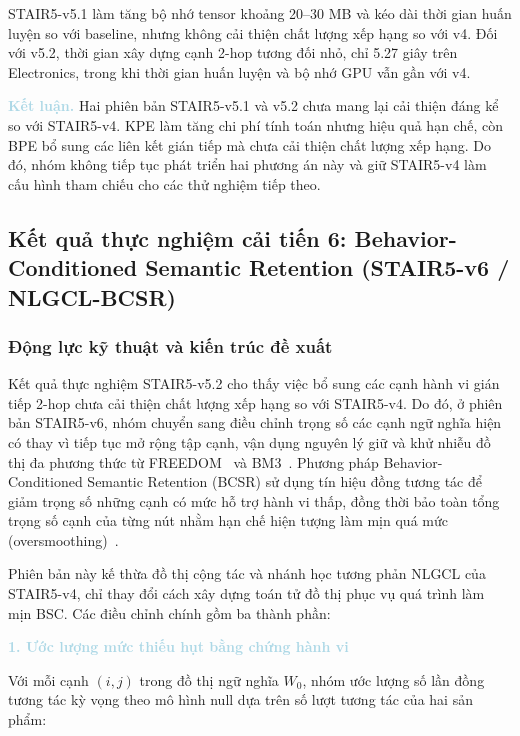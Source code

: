 STAIR5-v5.1 làm tăng bộ nhớ tensor khoảng 20--30 MB và kéo dài thời gian huấn luyện so với baseline, nhưng không cải thiện chất lượng xếp hạng so với v4. Đối với v5.2, thời gian xây dựng cạnh 2-hop tương đối nhỏ, chỉ 5.27 giây trên Electronics, trong khi thời gian huấn luyện và bộ nhớ GPU vẫn gần với v4.

\noindent\textcolor{lightblue}{\textbf{Kết luận.}} Hai phiên bản STAIR5-v5.1 và v5.2 chưa mang lại cải thiện đáng kể so với STAIR5-v4. KPE làm tăng chi phí tính toán nhưng hiệu quả hạn chế, còn BPE bổ sung các liên kết gián tiếp mà chưa cải thiện chất lượng xếp hạng. Do đó, nhóm không tiếp tục phát triển hai phương án này và giữ STAIR5-v4 làm cấu hình tham chiếu cho các thử nghiệm tiếp theo.

\subsection{Kết quả thực nghiệm cải tiến 6: Behavior-Conditioned Semantic Retention (STAIR5-v6 / NLGCL-BCSR)}

\subsubsection{Động lực kỹ thuật và kiến trúc đề xuất}

Kết quả thực nghiệm STAIR5-v5.2 cho thấy việc bổ sung các cạnh hành vi gián tiếp 2-hop chưa cải thiện chất lượng xếp hạng so với STAIR5-v4. Do đó, ở phiên bản STAIR5-v6, nhóm chuyển sang điều chỉnh trọng số các cạnh ngữ nghĩa hiện có thay vì tiếp tục mở rộng tập cạnh, vận dụng nguyên lý giữ và khử nhiễu đồ thị đa phương thức từ FREEDOM~\cite{zhou2023freedom} và BM3~\cite{zhou2023bm3}. Phương pháp Behavior-Conditioned Semantic Retention (BCSR) sử dụng tín hiệu đồng tương tác để giảm trọng số những cạnh có mức hỗ trợ hành vi thấp, đồng thời bảo toàn tổng trọng số cạnh của từng nút nhằm hạn chế hiện tượng làm mịn quá mức (oversmoothing)~\cite{oono2020graph}.

Phiên bản này kế thừa đồ thị cộng tác và nhánh học tương phản NLGCL của STAIR5-v4, chỉ thay đổi cách xây dựng toán tử đồ thị phục vụ quá trình làm mịn BSC. Các điều chỉnh chính gồm ba thành phần:

\noindent\textcolor{lightblue}{\textbf{1. Ước lượng mức thiếu hụt bằng chứng hành vi}}

Với mỗi cạnh $(i,j)$ trong đồ thị ngữ nghĩa $W_0$, nhóm ước lượng số lần đồng tương tác kỳ vọng theo mô hình null dựa trên số lượt tương tác của hai sản phẩm:

